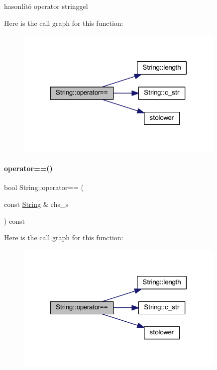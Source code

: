 hasonlító operator stringgel 

Here is the call graph for this function\+:
\nopagebreak
\begin{figure}[H]
\begin{center}
\leavevmode
\includegraphics[width=285pt]{class_string_aa94d2477f4f80aad7703bf4d7a39d332_cgraph}
\end{center}
\end{figure}
\mbox{\label{class_string_aa4f7798884d99a0e28712d4e4044d303}} 
\paragraph{\texorpdfstring{operator==()}{operator==()}\hspace{0.1cm}{\footnotesize\ttfamily [2/4]}}
{\footnotesize\ttfamily bool String\+::operator== (\begin{DoxyParamCaption}\item[{const \mbox{\hyperlink{class_string}{String}} \&}]{rhs\+\_\+s }\end{DoxyParamCaption}) const}

Here is the call graph for this function\+:
\nopagebreak
\begin{figure}[H]
\begin{center}
\leavevmode
\includegraphics[width=285pt]{class_string_aa4f7798884d99a0e28712d4e4044d303_cgraph}
\end{center}
\end{figure}
\mbox{\label{class_string_ade9af860a809548214837e33367e8835}} 
